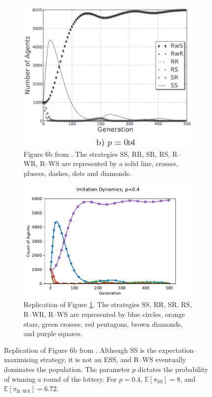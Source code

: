 \FloatBarrier 
\begin{figure}[!h]
  \begin{subfigure}[b]{0.45\textwidth}
    \includegraphics[width=\textwidth]{images/lotteryp4.png}
    \caption{Figure 6b from \cite{RN30}. The strategies SS, RR, SR, RS, R--WR, R--WS are represented by a solid line, crosses, plusses, dashes, dots and diamonds.}
    \label{lotteryp4}
  \end{subfigure}
  \hfill
  \begin{subfigure}[b]{0.45\textwidth}
    \includegraphics[width=1.25\textwidth]{images/lotteryp4_me.pdf}
    \caption{Replication of Figure \ref{lotteryp4}. The strategies SS, RR, SR, RS, R--WR, R--WS are represented by blue circles, orange stars, green crosses, red pentagons, brown diamonds, and purple squares. }
    \label{lotteryp4_me}
  \end{subfigure}
  \caption{Replication of Figure 6b from \cite{RN30}. Although SS is the expectation--maximising strategy, it is not an ESS, and R--WS eventually dominates the population. The parameter $p$ dictates the probability of winning a round of the lottery. For $p=0.4$, $\mathbb E [\pi_{\text{SS}}] = 8$, and $\mathbb E [\pi_{\text{R--WS}}] =6.72 $.} \label{lottery_comp4}
\end{figure} 
